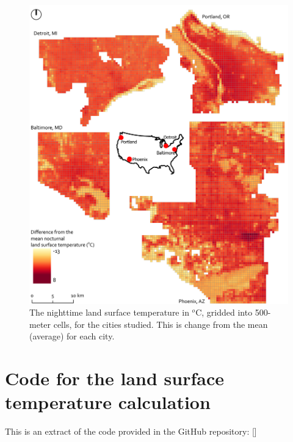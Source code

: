 \documentclass[final,3p,times,onecolumn,sort&compress]{elsarticle}
\begin{document}
\begin{figure}
    \centering
    \includegraphics[width=\textwidth]{fig/report/map_nocturnal_lst.pdf}
    \caption[The nighttime land surface temperature in $^o$C, gridded into 500-meter cells]{The nighttime land surface temperature in $^o$C, gridded into 500-meter cells, for the cities studied. This is change from the mean (average) for each city.}
    \label{fig:map}
\end{figure}


\newpage
\section{Code for the land surface temperature calculation}
\label{appendix:code}

This is an extract of the code provided in the GitHub repository: []
\end{document}
